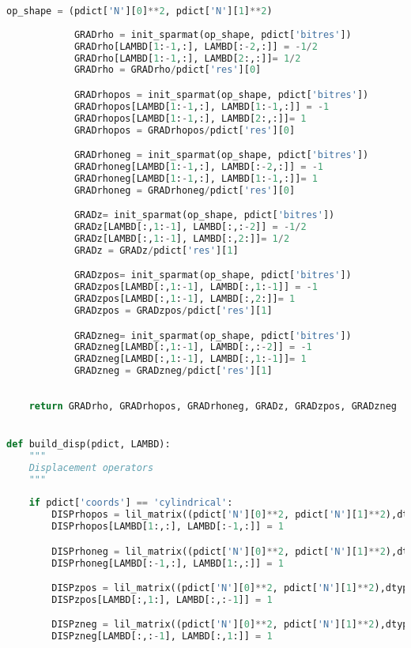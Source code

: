 \begin{lstlisting}[frame=single, language=Python]
            op_shape = (pdict['N'][0]**2, pdict['N'][1]**2)
            
            GRADrho = init_sparmat(op_shape, pdict['bitres'])
            GRADrho[LAMBD[1:-1,:], LAMBD[:-2,:]] = -1/2
            GRADrho[LAMBD[1:-1,:], LAMBD[2:,:]]= 1/2
            GRADrho = GRADrho/pdict['res'][0]

            GRADrhopos = init_sparmat(op_shape, pdict['bitres'])
            GRADrhopos[LAMBD[1:-1,:], LAMBD[1:-1,:]] = -1
            GRADrhopos[LAMBD[1:-1,:], LAMBD[2:,:]]= 1
            GRADrhopos = GRADrhopos/pdict['res'][0]

            GRADrhoneg = init_sparmat(op_shape, pdict['bitres'])
            GRADrhoneg[LAMBD[1:-1,:], LAMBD[:-2,:]] = -1
            GRADrhoneg[LAMBD[1:-1,:], LAMBD[1:-1,:]]= 1
            GRADrhoneg = GRADrhoneg/pdict['res'][0]

            GRADz= init_sparmat(op_shape, pdict['bitres'])
            GRADz[LAMBD[:,1:-1], LAMBD[:,:-2]] = -1/2
            GRADz[LAMBD[:,1:-1], LAMBD[:,2:]]= 1/2
            GRADz = GRADz/pdict['res'][1]

            GRADzpos= init_sparmat(op_shape, pdict['bitres'])
            GRADzpos[LAMBD[:,1:-1], LAMBD[:,1:-1]] = -1
            GRADzpos[LAMBD[:,1:-1], LAMBD[:,2:]]= 1
            GRADzpos = GRADzpos/pdict['res'][1]

            GRADzneg= init_sparmat(op_shape, pdict['bitres'])
            GRADzneg[LAMBD[:,1:-1], LAMBD[:,:-2]] = -1
            GRADzneg[LAMBD[:,1:-1], LAMBD[:,1:-1]]= 1
            GRADzneg = GRADzneg/pdict['res'][1]
        
        
    return GRADrho, GRADrhopos, GRADrhoneg, GRADz, GRADzpos, GRADzneg


def build_disp(pdict, LAMBD):
    """
    Displacement operators
    """
    
    if pdict['coords'] == 'cylindrical':
        DISPrhopos = lil_matrix((pdict['N'][0]**2, pdict['N'][1]**2),dtype=pdict['bitres'])
        DISPrhopos[LAMBD[1:,:], LAMBD[:-1,:]] = 1

        DISPrhoneg = lil_matrix((pdict['N'][0]**2, pdict['N'][1]**2),dtype=pdict['bitres'])
        DISPrhoneg[LAMBD[:-1,:], LAMBD[1:,:]] = 1

        DISPzpos = lil_matrix((pdict['N'][0]**2, pdict['N'][1]**2),dtype=pdict['bitres'])
        DISPzpos[LAMBD[:,1:], LAMBD[:,:-1]] = 1

        DISPzneg = lil_matrix((pdict['N'][0]**2, pdict['N'][1]**2),dtype=pdict['bitres'])
        DISPzneg[LAMBD[:,:-1], LAMBD[:,1:]] = 1
        

\end{lstlisting}
